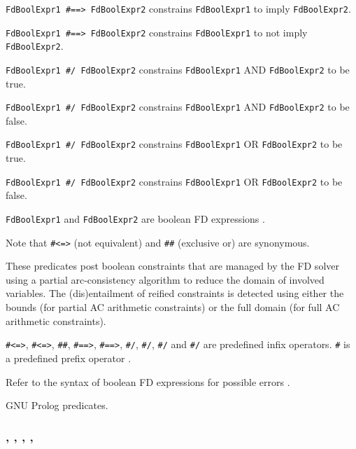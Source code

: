 \texttt{FdBoolExpr1 \#==> FdBoolExpr2} constrains
\texttt{FdBoolExpr1} to imply \texttt{FdBoolExpr2}.

\texttt{FdBoolExpr1 \#{\bs}==> FdBoolExpr2} constrains
\texttt{FdBoolExpr1} to not imply \texttt{FdBoolExpr2}.

\texttt{FdBoolExpr1 \#/{\bs} FdBoolExpr2} constrains \texttt{FdBoolExpr1}
AND \texttt{FdBoolExpr2} to be true.

\texttt{FdBoolExpr1 \#{\bs}/{\bs} FdBoolExpr2} constrains
\texttt{FdBoolExpr1} AND \texttt{FdBoolExpr2} to be false.

\texttt{FdBoolExpr1 \#{\bs}/ FdBoolExpr2} constrains \texttt{FdBoolExpr1}
OR \texttt{FdBoolExpr2} to be true.

\texttt{FdBoolExpr1 \#{\bs}{\bs}/ FdBoolExpr2} constrains
\texttt{FdBoolExpr1} OR \texttt{FdBoolExpr2} to be false.

\texttt{FdBoolExpr1} and \texttt{FdBoolExpr2} are boolean FD expressions
.

Note that \texttt{\#{\bs}<=>} (not equivalent) and \texttt{\#\#}
(exclusive or) are synonymous.

These predicates post boolean constraints that are managed by the FD solver
using a partial arc-consistency algorithm to reduce the domain of involved
variables. The (dis)entailment of reified constraints is detected using
either the bounds (for partial AC arithmetic constraints) or the full domain
(for full AC arithmetic constraints).

\texttt{\#<=>}, \texttt{\#{\bs}<=>}, \texttt{\#\#},
\texttt{\#==>}, \texttt{\#{\bs}==>}, \texttt{\#/{\bs}},
\texttt{\#{\bs}/{\bs}}, \texttt{\#{\bs}/} and \texttt{\#{\bs}{\bs}/} are
predefined infix operators. \texttt{\#{\bs}} is a predefined prefix operator
.

\Errors

Refer to the syntax of boolean FD expressions for possible errors
.

\Portability

GNU Prolog predicates.

\subsubsection{,\label{fd-cardinality/2}
               ,
               ,
               , \\
               }

